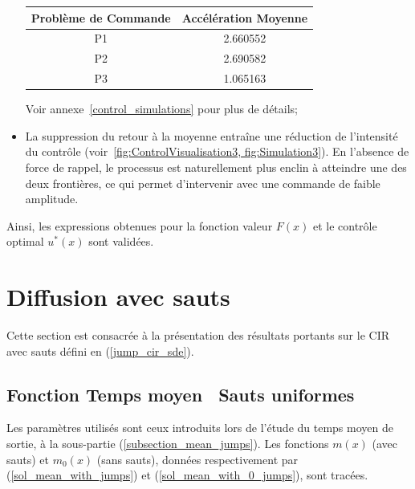 \begin{itemize}
\begin{table}[htb]
\begin{tabular}{||c|c||}
        \hline
        Problème de Commande & Accélération Moyenne \\\hline\hline
        P1 & 2.660552 \\
        P2 & 2.690582 \\
        P3 & 1.065163 \\\hline
        \end{tabular}
    \end{table}\FloatBarrier Voir annexe~\ref{control_simulations} pour plus de détails; 
    \item La suppression du retour à la moyenne entraîne une réduction de l'intensité du contrôle (voir~\ref{fig:ControlVisualisation3, fig:Simulation3}). En l'absence de force de rappel, le processus est naturellement plus enclin à atteindre une des deux frontières, ce qui permet d'intervenir avec une commande de faible amplitude.
\end{itemize}
Ainsi, les expressions obtenues pour la fonction valeur $F(x)$ et le contrôle optimal $u^*(x)$ sont validées.

\section{Diffusion avec sauts}

Cette section est consacrée à la présentation des résultats portants sur le \acs{CIR} avec sauts défini en (\ref{jump_cir_sde}).
\subsection{Fonction Temps moyen \textemdash~Sauts uniformes}
Les paramètres utilisés sont ceux introduits lors de l'étude du temps moyen de sortie, à la sous-partie (\ref{subsection_mean_jumps}). Les fonctions \( m(x) \) (avec sauts) et \( m_0(x) \) (sans sauts), données respectivement par (\ref{sol_mean_with_jumps}) et (\ref{sol_mean_with_0_jumps}), sont tracées.
